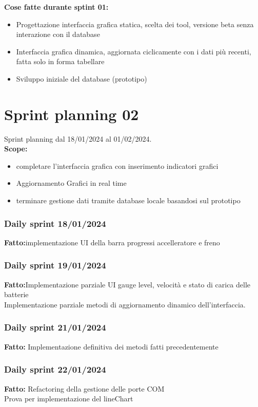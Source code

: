 \documentclass{report}
\begin{document}
\textbf{Cose fatte durante sptint 01:}
\begin{itemize}
\item Progettazione interfaccia grafica statica, scelta dei tool, versione beta senza interazione con il database
\item Interfaccia grafica dinamica, aggiornata ciclicamente con i dati più recenti, fatta solo in forma tabellare
\item Sviluppo iniziale del database (prototipo)
\end{itemize}

\chapter{Sprint planning 02}
Sprint planning dal 18/01/2024 al 01/02/2024.\\

\textbf{Scope:}
\begin{itemize}
\item completare l'interfaccia grafica con inserimento indicatori grafici
\item Aggiornamento Grafici in real time 
\item terminare gestione dati tramite database locale basandosi sul prototipo
\end{itemize}

\subsection*{Daily sprint 18/01/2024}
\textbf{Fatto:}implementazione UI della barra progressi accelleratore e freno\\

\subsection*{Daily sprint 19/01/2024}
\textbf{Fatto:}Implementazione parziale UI gauge level, velocità e stato di carica delle batterie\\
Implementazione parziale metodi di aggiornamento dinamico dell'interfaccia.

\subsection*{Daily sprint 21/01/2024}
\textbf{Fatto:} Implementazione definitiva dei metodi fatti precedentemente

\subsection*{Daily sprint 22/01/2024}
\textbf{Fatto:} Refactoring della gestione delle porte COM\\
Prova per implementazione del lineChart
\end{document}
